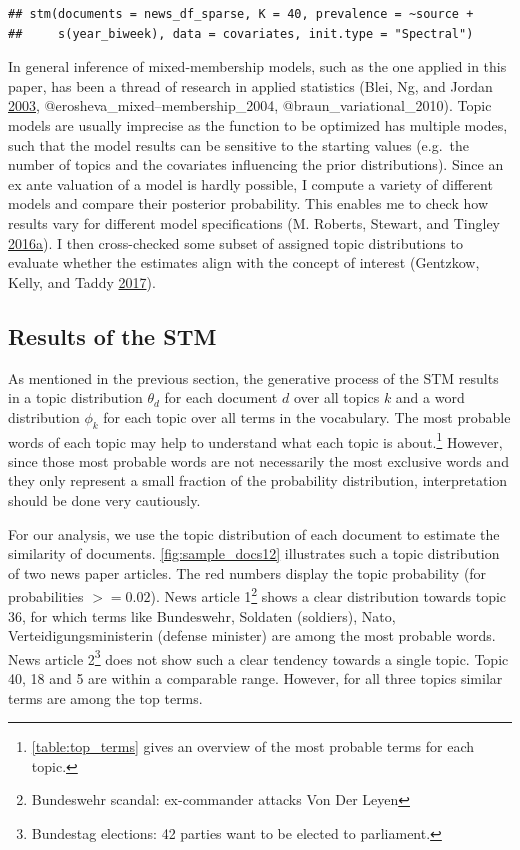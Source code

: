 \documentclass[
]{article}
\begin{document}
\begin{verbatim}
## stm(documents = news_df_sparse, K = 40, prevalence = ~source + 
##     s(year_biweek), data = covariates, init.type = "Spectral")
\end{verbatim}

In general inference of mixed-membership models, such as the one applied
in this paper, has been a thread of research in applied statistics
(Blei, Ng, and Jordan \protect\hyperlink{ref-blei_latent_2003}{2003},
@erosheva\_mixed--membership\_2004, @braun\_variational\_2010). Topic
models are usually imprecise as the function to be optimized has
multiple modes, such that the model results can be sensitive to the
starting values (e.g.~the number of topics and the covariates
influencing the prior distributions). Since an ex ante valuation of a
model is hardly possible, I compute a variety of different models and
compare their posterior probability. This enables me to check how
results vary for different model specifications (M. Roberts, Stewart,
and Tingley
\protect\hyperlink{ref-roberts_navigating_2016}{2016}\protect\hyperlink{ref-roberts_navigating_2016}{a}).
I then cross-checked some subset of assigned topic distributions to
evaluate whether the estimates align with the concept of interest
(Gentzkow, Kelly, and Taddy
\protect\hyperlink{ref-gentzkow_text_2017}{2017}).

\hypertarget{results-of-the-stm}{%
\subsection{Results of the STM}\label{results-of-the-stm}}

As mentioned in the previous section, the generative process of the STM
results in a topic distribution \(\theta_d\) for each document \(d\)
over all topics \(k\) and a word distribution \(\phi_k\) for each topic
over all terms in the vocabulary. The most probable words of each topic
may help to understand what each topic is about.\footnote{\autoref{table:top_terms}
  gives an overview of the most probable terms for each topic.} However,
since those most probable words are not necessarily the most exclusive
words and they only represent a small fraction of the probability
distribution, interpretation should be done very cautiously.

For our analysis, we use the topic distribution of each document to
estimate the similarity of documents. \autoref{fig:sample_docs12}
illustrates such a topic distribution of two news paper articles. The
red numbers display the topic probability (for probabilities
\(>= 0.02\)). News article 1\footnote{Bundeswehr scandal: ex-commander
  attacks Von Der Leyen} shows a clear distribution towards topic 36,
for which terms like Bundeswehr, Soldaten (soldiers), Nato,
Verteidigungsministerin (defense minister) are among the most probable
words. News article 2\footnote{Bundestag elections: 42 parties want to
  be elected to parliament.} does not show such a clear tendency towards
a single topic. Topic 40, 18 and 5 are within a comparable range.
However, for all three topics similar terms are among the top terms.
\end{document}
